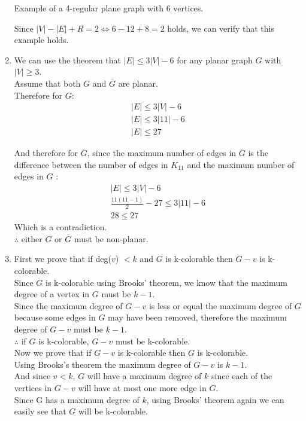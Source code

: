 \documentclass[11pt]{article}
\begin{document}
\begin{enumerate}[]
\begin{center}
		Example of a 4-regular plane graph with 6 vertices.
	\end{center}
	Since $|V|-|E|+R=2 \iff 6 - 12 + 8 = 2$ holds, we can verify that this example holds.
   		
    \item
		We can use the theorem that $|E| \leq 3|V|-6$ for any planar graph $G$ with $|V| \geq 3$.\\
		Assume that both $G$ and $\overline{G}$ are planar.\\
		Therefore for $G$:
		\begin{gather}
		|E| \leq 3|V|-6 \nonumber \\
		|E| \leq 3|11|-6 \nonumber \\
		|E| \leq 27 \nonumber
		\end{gather}
		
		And therefore for $\overline{G}$, since the maximum number of edges in $\overline{G}$ is the difference between the number of edges in $K_{11}$ and the maximum number of edges in $G$ :
		\begin{gather}
		|E| \leq 3|V|-6 \nonumber \\
		\frac{11(11-1)}{2} -27 \leq 3|11|-6 \nonumber \\
		28 \leq 27 \nonumber
		\end{gather}
		Which is a contradiction.\\
		$\therefore$ either $G$ or $\overline{G}$ must be non-planar.
    \item
    	First we prove that if deg($v$) $< k$ and $G$ is k-colorable then $G-v$ is k-colorable.\\
		Since $G$ is k-colorable using Brooks' theorem, we know that the maximum degree of a vertex in $G$ must be $k-1$.\\
		Since the maximum degree of $G-v$ is less or equal the maximum degree of $G$ because some edges in $G$ may have been removed, therefore the maximum degree of $G-v$ must be $k-1$.\\
		$\therefore$ if $G$ is k-colorable, $G-v$ must be k-colorable.\\
    	Now we prove that if $G-v$ is k-colorable then $G$ is k-colorable.\\    	
    	Using Brooks's theorem the maximum degree of $G-v$ is $k-1$.\\
    	And since $v<k$, $G$ will have a maximum degree of $k$ since each of the vertices in $G-v$ will have at most one more edge in $G$.\\
		Since G has a maximum degree of $k$, using Brooks' theorem again we can easily see that $G$ will be k-colorable.\\  

\end{enumerate}
\end{document}
